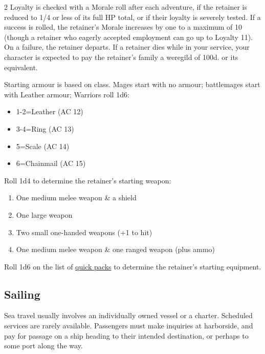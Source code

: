 \documentclass{book}
\providecommand{\tightlist}{%
\setlength{\itemsep}{0pt}\setlength{\parskip}{0pt}}
\begin{document}
\begin{multicols}{2}
\normalsize Loyalty is checked with a Morale roll after each adventure, if the
retainer is reduced to 1/4 or less of its full HP total, or if their
loyalty is severely tested. If a success is rolled, the retainer's
Morale increases by one to a maximum of 10 (though a retainer who
eagerly accepted employment can go up to Loyalty 11). On a failure, the
retainer departs. If a retainer dies while in your service, your
character is expected to pay the retainer's family a weregild of 100d.
or its equivalent.

Starting armour is based on class. Mages start with no armour;
battlemages start with Leather armour; Warriors roll 1d6:

\begin{itemize}
\tightlist
\item
  1-2=Leather (AC 12)
\item
  3-4=Ring (AC 13)
\item
  5=Scale (AC 14)
\item
  6=Chainmail (AC 15)
\end{itemize}

Roll 1d4 to determine the retainer's starting weapon:

\begin{enumerate}
\def\labelenumi{\arabic{enumi}.}
\tightlist
\item
  One medium melee weapon \& a shield
\item
  One large weapon
\item
  Two small one-handed weapons (+1 to hit)
\item
  One medium melee weapon \& one ranged weapon (plus ammo)
\end{enumerate}

Roll 1d6 on the list of \hyperref[quick-packs]{quick packs} to determine
the retainer's starting equipment.

\end{multicols}

\newpage

\subsection*{Sailing}\label{sailing}

Sea travel usually involves an individually owned vessel or a charter.
Scheduled services are rarely available. Passengers must make inquiries
at harborside, and pay for passage on a ship heading to their intended
destination, or perhaps to some port along the way.
\end{document}
